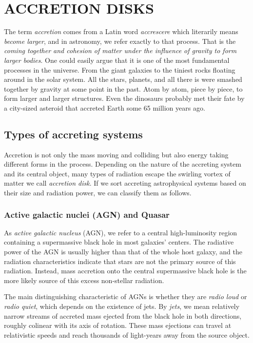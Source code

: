 \chapter{ACCRETION DISKS}

The term \emph{accretion} comes from a Latin word \emph{accrescere} which literarily means \emph{become larger}, and in astronomy, we refer exactly to that process. That is the \emph{coming together and cohesion of matter under the influence of gravity to form larger bodies}. One could easily argue that it is one of the most fundamental processes in the universe. From the giant galaxies to the tiniest rocks floating around in the solar system. All the stars, planets, and all there is were smashed together by gravity at some point in the past. Atom by atom, piece by piece, to form larger and larger structures. Even the dinosaurs probably met their fate by a city-sized asteroid that accreted Earth some 65 million years ago. 

\section{Types of accreting systems}

Accretion is not only the mass moving and colliding but also energy taking different forms in the process. Depending on the nature of the accreting system and its central object, many types of radiation escape the swirling vortex of matter we call \emph{accretion disk}. If we sort accreting astrophysical systems based on their size and radiation power, we can classify them as follows.

\subsection{Active galactic nuclei (AGN) and Quasar}

As \emph{active galactic nucleus} (AGN), we refer to a central high-luminosity region containing a supermassive black hole in most galaxies' centers. The radiative power of the AGN is usually higher than that of the whole host galaxy, and the radiation characteristics indicate that stars are not the primary source of this radiation. Instead, mass accretion onto the central supermassive black hole is the more likely source of this excess non-stellar radiation. 

The main distinguishing characteristic of AGNs is whether they are \emph{radio loud} or \emph{radio quiet}, which depends on the existence of jets. By \emph{jets}, we mean relatively narrow streams of accreted mass ejected from the black hole in both directions, roughly colinear with its axis of rotation. These mass ejections can travel at relativistic speeds and reach thousands of light-years away from the source object. 

